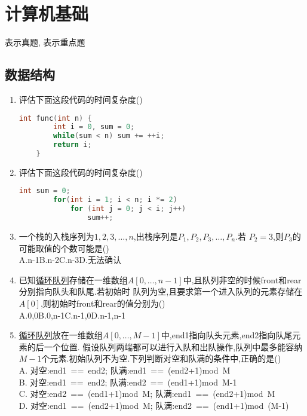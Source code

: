 \documentclass[12pt, a4paper, oneside, UTF8]{ctexbook}
\begin{document}
% 
\else
\fi

\chapter{计算机基础}
\begin{tcolorbox}
    \bt[1] 表示真题, \bl[1] 表示重点题 
\end{tcolorbox}
\section{数据结构}
\begin{enumerate}
    \item  评估下面这段代码的时间复杂度()
\begin{lstlisting}[language=C]
    int func(int n) {
        int i = 0, sum = 0;
        while(sum < n) sum += ++i;
        return i;
    }
\end{lstlisting}

    \item 评估下面这段代码的时间复杂度()
\begin{lstlisting}[language=C]
    int sum = 0;
        for(int i = 1; i < n; i *= 2)
            for (int j = 0; j < i; j++)
                sum++;
\end{lstlisting}

    \item 一个栈的入栈序列为\underline{$1,2,3,\ldots,n$},出栈序列是\underline{$P_1,P_2,P_3,\ldots,P_n$}.若
    $P_2=3$,则$P_3$的可能取值的个数可能是() \\
    A.n-1\qquad B.n-2\qquad C.n-3\qquad D.无法确认 

    \item 已知\underline{循环队列}存储在一维数组$A[0,\ldots,n-1]$中,且队列非空的时候front和rear分别指向队头和队尾.若初始时
    队列为空,且要求第一个进入队列的元素存储在$A[0]$,则初始时front和rear的值分别为() \\
    A.0,0\qquad\qquad B.0,n-1\qquad\qquad C.n-1,0\qquad\qquad D.n-1,n-1

    \item \underline{循环队列}放在一维数组$A[0,\ldots,M-1]$中,end1指向队头元素,end2指向队尾元素的后一个位置.
    假设队列两端都可以进行入队和出队操作,队列中最多能容纳$M-1$个元素.初始队列不为空.下列判断对空和队满的条件中,正确的是() \\
    A. 对空:end1\ ==\ end2; \qquad\qquad\qquad\qquad\quad 队满:end1\ ==\ (end2+1)mod\ M\\
    B. 对空:end1\ ==\ end2; \qquad\qquad\qquad\qquad\quad 队满:end2\ ==\ (end1+1)mod\ M-1\\
    C. 对空:end2\ ==\ (end1+1)mod\ M; \qquad\qquad 队满:end1\ ==\ (end2+1)mod\ M\\
    D. 对空:end1\ ==\ (end2+1)mod\ M; \qquad\qquad 队满:end2\ ==\ (end1+1)mod\ (M-1)
    

\end{enumerate}
\end{document}
